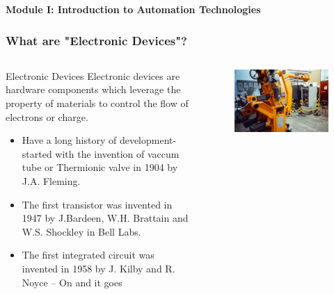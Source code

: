 \begin{frame}
\center
\textbf{\huge{Module I: Introduction to Automation Technologies}}
\end{frame}

\begin{frame}
	\frametitle{What are "Electronic Devices"?}
	\begin{columns}
		\begin{column}{0.5\textwidth}
			\begin{varblock}{Electronic Devices}
				Electronic devices are hardware components which leverage the property of materials to control the flow of electrons or charge.
			\end{varblock} \vspace{-0.5cm}		
			\begin{itemize}
				\item<2-> Have a long history of development- started with the invention of vaccum tube or Thermionic valve in 1904 by J.A. Fleming.
				\item<3-> The first transistor was invented in 1947 by J.Bardeen, W.H. Brattain and W.S. Shockley in Bell Labs.
				\item<4-> The first integrated circuit was invented in 1958 by J. Kilby and R. Noyce -- On and it goes
			\end{itemize}
		\end{column}
		\begin{column}{0.5\textwidth}
			\begin{figure}
				\centering
				\includegraphics[scale= 0.05]{fig/lec01/Componentes.jpg}

\end{figure}
\end{column}
\end{columns}
\end{frame}
